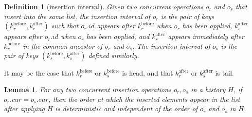 \documentclass[10pt,journal,compsoc]{IEEEtran}
\newtheorem{definition}{Definition}
\newtheorem{lemma}[theorem]{Lemma}
\begin{document}
\begin{definition}[insertion interval]\label{def:insert-interval}
Given two concurrent operations $o_r$ and $o_s$ that insert into the same list, the \emph{insertion interval} of $o_r$ is the pair of keys $(k_r^\mathrm{before}, k_r^\mathrm{after})$ such that $o_r.\mathit{id}$ appears after $k_r^\mathrm{before}$ when $o_r$ has been applied, $k_r^\mathrm{after}$ appears after $o_r.\mathit{id}$ when $o_r$ has been applied, and $k_r^\mathrm{after}$ appears immediately after $k_r^\mathrm{before}$ in the common ancestor of $o_r$ and $o_s$. The insertion interval of $o_s$ is the pair of keys $(k_s^\mathrm{before}, k_s^\mathrm{after})$ defined similarly.
\end{definition}

It may be the case that $k_r^\mathrm{before}$ or $k_s^\mathrm{before}$ is \textsf{head}, and that $k_r^\mathrm{after}$ or $k_s^\mathrm{after}$ is \textsf{tail}.

\begin{lemma}\label{lem:insert-conflict}
For any two concurrent insertion operations $o_r, o_s$ in a history $H$, if $o_r.\mathit{cur} = o_s.\mathit{cur}$, then the order at which the inserted elements appear in the list after applying $H$ is deterministic and independent of the order of $o_r$ and $o_s$ in $H$.
\end{lemma}
\end{document}
